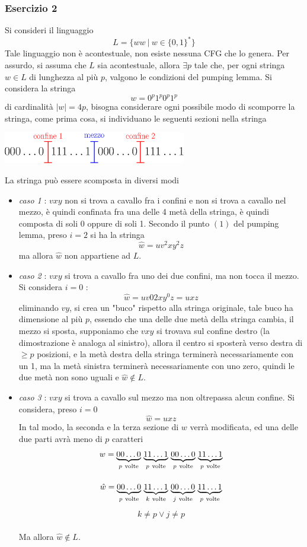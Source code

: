 \documentclass[10pt, letterpaper]{report}
\begin{document}
\subsubsection{Esercizio 2}\label{es2}
Si consideri il linguaggio 
$$ L=\{ww \ | \  w\in\{0,1\}^* \}$$
Tale linguaggio non è acontestuale, non esiste nessuna CFG che lo genera. Per assurdo, si assuma che $L$ sia 
acontestuale, allora $\exists p$ tale che, per ogni stringa $w\in L$ di lunghezza al più 
$p$, valgono le condizioni del pumping lemma. \acc Si considera la stringa $$ w=0^p1^p0^p1^p$$ di cardinalità $|w|=4p$, 
bisogna considerare ogni possibile modo di scomporre la stringa, come prima cosa, si individuano le seguenti sezioni 
nella stringa\begin{center}
    \includegraphics[width=0.6\textwidth ]{images/sezioniStringa4p.eps}
\end{center}
La stringa può essere scomposta in diversi modi\begin{itemize}
    \item \textit{caso 1} : $vxy$ non si trova a cavallo fra i confini e non si trova a cavallo nel mezzo, è 
    quindi confinata fra una delle 4 metà della stringa, è quindi composta di soli 0 oppure di soli 1. Secondo il punto 
 $(1)$ del pumping lemma, preso $i=2$ si ha la stringa $$ \hat w = uv^2xy^2z$$
ma allora $\hat w$ non appartiene ad $L$. 
\item \textit{caso 2} : $vxy$ si trova a cavallo fra uno dei due confini, ma non tocca il mezzo. Si considera $i=0$ : 
$$ \hat w = uv02xy^0z=uxz$$
eliminando $vy$, si crea un "buco" rispetto alla stringa originale, tale buco ha dimensione 
al più $p$, essendo che una delle due metà della stringa cambia, il mezzo si sposta, supponiamo che $vxy$ si trovava sul confine 
destro (la dimostrazione è analoga al sinistro), allora il centro si sposterà verso destra di $\ge p$ posizioni, e la metà destra della 
stringa terminerà necessariamente con un 1, ma la metà sinistra terminerà necessariamente con uno zero, quindi le due metà 
non sono uguali e $\hat w\notin L$. 
\item \textit{caso 3} : $vxy$ si trova a cavallo sul mezzo ma non oltrepassa alcun confine. Si considera, preso $i=0$
$$ \hat w = uxz$$ 
In tal modo, la seconda e la terza sezione di $w$ verrà modificata, ed una delle due parti avrà meno di $p$ caratteri 
$$  w = \smash{\underbrace{00\dots 0}_{p\ \text{volte}}} \
\smash{\underbrace{11\dots 1}_{p\ \text{volte}}} \
\smash{\underbrace{00\dots 0}_{p\ \text{volte}}} \
\smash{\underbrace{11\dots 1}_{p\ \text{volte}}} $$ 
\\
$$ \hat w = \smash{\underbrace{00\dots 0}_{p\ \text{volte}}} \
\smash{\underbrace{11\dots 1}_{k\ \text{volte}}} \
\smash{\underbrace{00\dots 0}_{j\ \text{volte}}} \
\smash{\underbrace{11\dots 1}_{p\ \text{volte}}} $$\\ $$k\ne p\lor j\ne p $$
\\Ma allora $\hat w \notin L$.
\end{itemize}
\end{document}
